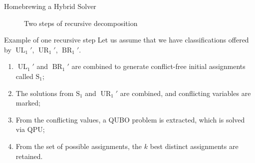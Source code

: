 \begin{block}{Homebrewing a Hybrid Solver}
\begin{figure}[h!]
\begin{minipage}{0.4\textwidth}
            \caption{Two steps of recursive decomposition}
            \label{fig:qubo}
        \end{minipage}
    \end{figure}

    \begin{exampleblock}{Example of one recursive step}
        Let us assume that we have classifications offered by $\operatorname{UL}_1'$, $\operatorname{UR}_1'$, $\operatorname{BR}_1'$. 

        \begin{enumerate}
            \item $\operatorname{UL}_1'$ and $\operatorname{BR}_1'$ are combined to generate conflict-free initial assignments called $\operatorname{S_1}$;
            \item The solutions from $\operatorname{S_1}$ and $\operatorname{UR}_1'$ are combined, and conflicting variables are marked;
            \item From the conflicting values, a QUBO problem is extracted, which is solved via QPU;
            \item From the set of possible assignments, the $k$ best distinct assignments are retained. 
        \end{enumerate}
    \end{exampleblock}
\end{block}
